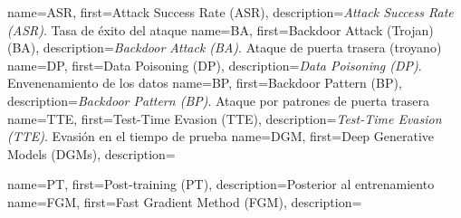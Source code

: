               {name={ASR},    first={Attack Success Rate (ASR)},      description={\textit{Attack Success Rate (ASR)}. Tasa de éxito del ataque}}
               {name={BA},     first={Backdoor Attack (Trojan) (BA)},  description={\textit{Backdoor Attack (BA)}. Ataque de puerta trasera (troyano)}}
               {name={DP},     first={Data Poisoning (DP)},            description={\textit{Data Poisoning (DP)}. Envenenamiento de los datos}}
      {name={BP},     first={Backdoor Pattern (BP)},          description={\textit{Backdoor Pattern (BP)}. Ataque por patrones de puerta trasera}}
              {name={TTE},    first={Test-Time Evasion (TTE)},        description={\textit{Test-Time Evasion (TTE)}. Evasión en el tiempo de prueba}}
              {name={DGM},    first={Deep Generative Models (DGMs)},  description={}}




   {name={PT},  first={Post-training (PT)},            description={Posterior al entrenamiento}}
  {name={FGM}, first={Fast Gradient Method (FGM)},    description={}}


